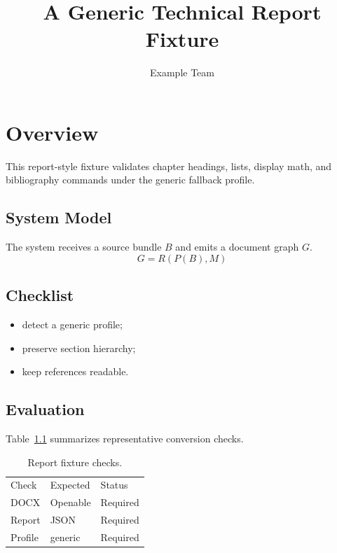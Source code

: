 \documentclass{report}
\begin{document}
\title{A Generic Technical Report Fixture}
\author{Example Team}
\maketitle
\chapter{Overview}
This report-style fixture validates chapter headings, lists, display math, and bibliography commands under the generic fallback profile.
\section{System Model}
The system receives a source bundle $B$ and emits a document graph $G$.
\begin{equation}
  G = R(P(B), M) \label{eq:graph-render}
\end{equation}
\section{Checklist}
\begin{itemize}
  \item detect a generic profile;
  \item preserve section hierarchy;
  \item keep references readable.
\end{itemize}
\section{Evaluation}
Table~\ref{tab:generic-report} summarizes representative conversion checks.
\begin{table}[ht]
\centering
\begin{tabular}{lll}
Check & Expected & Status\\
DOCX & Openable & Required\\
Report & JSON & Required\\
Profile & generic & Required\\
\end{tabular}
\caption{Report fixture checks.}
\label{tab:generic-report}
\end{table}


\end{document}

